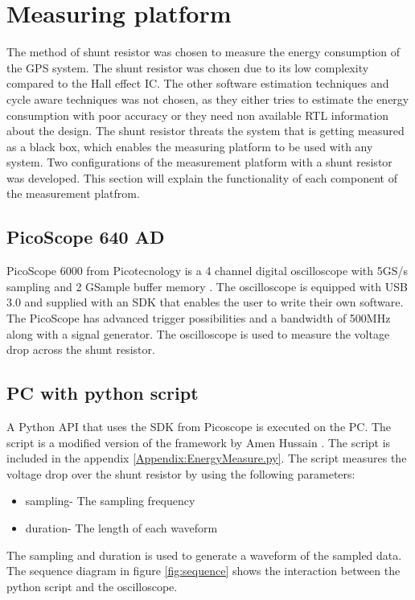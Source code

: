 \chapter{Measuring platform}

The method of shunt resistor was chosen to measure the energy consumption of the GPS system. The shunt resistor was chosen due to its low complexity compared to the Hall effect IC.  The other software estimation techniques and cycle aware techniques was not chosen, as they either tries to estimate the energy consumption with poor accuracy or they need non available RTL information about the design. The shunt resistor threats the system that is getting measured as a black box, which enables the measuring platform to be used with any system. Two configurations of the measurement platform with a shunt resistor was developed. This section will explain the functionality of each component of the measurement platfrom.


\section{PicoScope 640 AD}
PicoScope 6000 from Picotecnology is a 4 channel digital oscilloscope with 5GS/s sampling and 2 GSample buffer memory \cite{Pico}. The oscilloscope is equipped with USB 3.0 and supplied with an SDK that enables the user to write their own software. The PicoScope has advanced trigger possibilities and a bandwidth of 500MHz along with a signal generator. The oscilloscope is used to measure the voltage drop across the shunt resistor.   

\section{PC with python script}
A Python API that uses the SDK from Picoscope is executed on the PC. The script is a modified version of the framework by Amen Hussain \cite{Amen}. The script is included in the appendix \ref{Appendix:EnergyMeasure.py}. The script measures the voltage drop over the shunt resistor by using the following parameters:

\begin{itemize}
    \item sampling- The sampling frequency 
    \item duration- The length of each waveform
    
\end{itemize}
The sampling and duration is used to generate a waveform of the sampled data.
The sequence diagram in figure \ref{fig:sequence} shows the interaction between the python script and the oscilloscope.  

